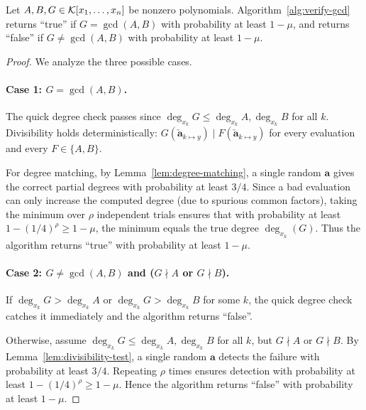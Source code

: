 \documentclass{article}
\numberwithin{equation}{section}
\begin{document}
\begin{theorem}\label{the:verify-gcd}
Let $A, B, G \in {\mathcal{K}}[x_1,\dots,x_n]$ be nonzero polynomials. Algorithm~\ref{alg:verify-gcd} returns ``true'' if $G = \gcd(A,B)$ with probability at least $1-\mu$, and returns ``false'' if $G \neq \gcd(A,B)$ with probability at least $1-\mu$.
\end{theorem}

\begin{proof}
We analyze the three possible cases.

\paragraph{Case 1: $G = \gcd(A, B)$.}
The quick degree check passes since $\deg_{x_k} G \le \deg_{x_k} A, \deg_{x_k} B$ for all $k$. Divisibility holds deterministically: $G(\mathbf{\check{a}}_{k \mapsto y} ) \mid F(\mathbf{\check{a}}_{k \mapsto y} )$ for every evaluation and every $F \in \{A, B\}$.

For degree matching, by Lemma~\ref{lem:degree-matching}, a single random $\mathbf{a}$ gives the correct partial degrees with probability at least $3/4$. Since a bad evaluation can only increase the computed degree (due to spurious common factors), taking the minimum over $\rho$ independent trials ensures that with probability at least $1 - (1/4)^\rho \ge 1-\mu$, the minimum equals the true degree $\deg_{x_k}(G)$. Thus the algorithm returns ``true'' with probability at least $1-\mu$.

\paragraph{Case 2: $G \neq \gcd(A, B)$ and ($G \nmid A$ or $G \nmid B$).}
If $\deg_{x_k} G > \deg_{x_k} A$ or $\deg_{x_k} G > \deg_{x_k} B$ for some $k$, the quick degree check catches it immediately and the algorithm returns ``false''.

Otherwise, assume $\deg_{x_k} G \le \deg_{x_k} A, \deg_{x_k} B$ for all $k$, but $G \nmid A$ or $G \nmid B$. By Lemma~\ref{lem:divisibility-test}, a single random $\mathbf{a}$ detects the failure with probability at least $3/4$. Repeating $\rho$ times ensures detection with probability at least $1 - (1/4)^\rho \ge 1-\mu$. Hence the algorithm returns ``false'' with probability at least $1-\mu$.


\end{proof}
\end{document}
